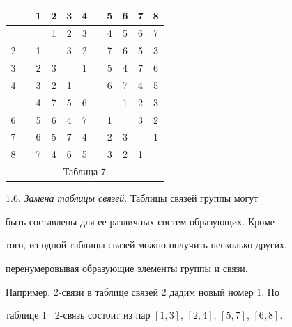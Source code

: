 \begin{center}


\begin{tabular}{ccccccccccc}


\ & \vline & 1 & 2 & 3 & 4 & \vline & 5 & 6 & 7 & 8 \\


\hline


 1 & \vline & \ & 1 & 2 & 3 & \vline & 4 & 5 & 6 & 7 \\


2 & \vline & 1 & \ & 3 & 2 & \vline & 7 & 6 & 5 & 3 \\


3 & \vline & 2 & 3 & \ & 1 & \vline & 5 & 4 & 7 & 6 \\


4 & \vline & 3 & 2 & 1 & \ & \vline & 6 & 7 & 4 & 5 \\


\hline


 5 & \vline & 4 & 7 & 5 & 6 & \vline & \ & 1 & 2 & 3 \\


6 & \vline & 5 & 6 & 4 & 7 & \vline & 1 & \ & 3 & 2 \\


7 & \vline & 6 & 5 & 7 & 4 & \vline & 2 & 3 & \ & 1 \\


8 & \vline & 7 & 4 & 6 & 5 & \vline & 3 & 2 & 1 & \ \\


\multicolumn{11}{c}{ Таблица 7}


\end{tabular}


\end{center}


\medskip








1.6. {\it Замена таблицы связей}. Таблицы связей группы могут 


быть составлены для ее различных систем образующих. Кроме


того, из одной таблицы связей можно получить несколько других,


перенумеровывая образующие элементы группы и связи.





Например, 2-связи в таблице связей 2 дадим новый номер 1. По


таблице 1 \ 2-связь состоит из пар $[1,3]$, $[2,4]$, $[5,7]$, $[6,8]$.


